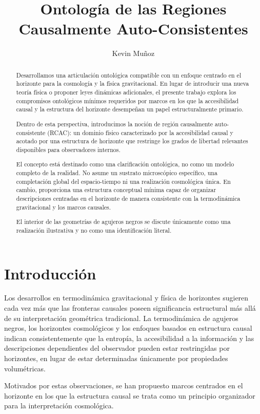 \documentclass[12pt,a4paper]{article}
\title{Ontología de las Regiones Causalmente Auto-Consistentes}
\author{Kevin Mu\~noz}
\date{}
\begin{document}
\maketitle

\begin{abstract}
Desarrollamos una articulación ontológica compatible con un enfoque centrado en el horizonte para la cosmología y la física gravitacional. En lugar de introducir una nueva teoría física o proponer leyes dinámicas adicionales, el presente trabajo explora los compromisos ontológicos mínimos requeridos por marcos en los que la accesibilidad causal y la estructura del horizonte desempeñan un papel estructuralmente primario.

Dentro de esta perspectiva, introducimos la noción de región causalmente auto-consistente (RCAC): un dominio físico caracterizado por la accesibilidad causal y acotado por una estructura de horizonte que restringe los grados de libertad relevantes disponibles para observadores internos.

El concepto está destinado como una clarificación ontológica, no como un modelo completo de la realidad. No asume un sustrato microscópico específico, una completación global del espacio-tiempo ni una realización cosmológica única. En cambio, proporciona una estructura conceptual mínima capaz de organizar descripciones centradas en el horizonte de manera consistente con la termodinámica gravitacional y los marcos causales.

El interior de las geometrías de agujeros negros se discute únicamente como una realización ilustrativa y no como una identificación literal.
\end{abstract}

\section{Introducción}

Los desarrollos en termodinámica gravitacional y física de horizontes sugieren cada vez más que las fronteras causales poseen significancia estructural más allá de su interpretación geométrica tradicional. La termodinámica de agujeros negros, los horizontes cosmológicos y los enfoques basados en estructura causal indican consistentemente que la entropía, la accesibilidad a la información y las descripciones dependientes del observador pueden estar restringidas por horizontes, en lugar de estar determinadas únicamente por propiedades volumétricas.

Motivados por estas observaciones, se han propuesto marcos centrados en el horizonte en los que la estructura causal se trata como un principio organizador para la interpretación cosmológica.
\end{document}
